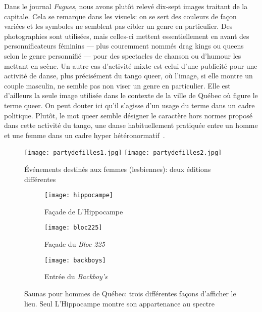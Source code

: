 Dans le journal \emph{Fugues}, nous avons plutôt relevé dix-sept images traitant de la capitale.
Cela se remarque dans les visuels: on se sert des couleurs de façon variées et les symboles ne semblent pas cibler un genre en particulier.
Des photographies sont utilisées, mais celles-ci mettent essentiellement en avant des personnificateurs féminins --- plus couremment nommés drag kings ou queens selon le genre personnifié --- pour des spectacles de chanson ou d'humour les mettant en scène.
Un autre cas d'activité mixte est celui d'une publicité pour une activité de danse, plus précisément du tango queer, où l'image, si elle montre un couple masculin, ne semble pas non viser un genre en particulier.
Elle est d'ailleurs la seule image utilisée dans le contexte de la ville de Québec où figure le terme queer.
On peut douter ici qu'il s'agisse d'un usage du terme dans un cadre politique.
Plutôt, le mot queer semble désigner le caractère hors normes proposé dans cette activité du tango, une danse habituellement pratiquée entre un homme et une femme dans un cadre hyper hétéronormatif~\citep[135]{Savigliano2010}.

\begin{figure}[ht]
 \centering
 {\texttt{[image: partydefilles1.jpg]}}
 {\texttt{[image: partydefilles2.jpg]}}
 \caption[Événements destinés aux femmes (lesbiennes)]{Événements destinés aux femmes (lesbiennes): deux éditions différentes}\label{figs:partydefilles}
\end{figure}

\begin{figure}[ht]
 \centering
 \begin{subfigure}[b]{.45\linewidth}
 \texttt{[image: hippocampe]}
 \caption{Façade de L'Hippocampe\label{fig:hippocampe}}
 \end{subfigure}

 \begin{subfigure}[b]{.45\linewidth}
 \texttt{[image: bloc225]}
 \caption{Façade du \emph{Bloc 225}\label{fig:bloc225}}
 \end{subfigure}
 \begin{subfigure}[b]{.45\linewidth}
 \texttt{[image: backboys]}
 \caption{Entrée du \emph{Backboy's}\label{fig:backboys}}
 \end{subfigure}
 \caption[Saunas pour hommes de Québec]{Saunas pour hommes de Québec: trois différentes façons d'afficher le lieu. Seul L'Hippocampe montre son appartenance au spectre \lgbt{}}\label{figs:saunas}
\end{figure}


